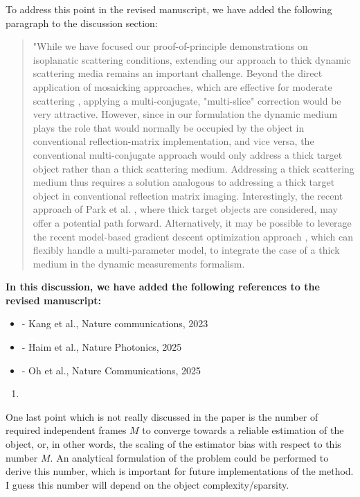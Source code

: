 \documentclass[12pt]{article}
\newenvironment{solved_reviewercomment}
    {\begin{tcolorbox}[width=\linewidth,colback=gray!5,colframe=solved_commentcolor!50,title=Reviewer Comment,left=5pt,right=5pt]}
    {\end{tcolorbox}}
\newenvironment{ourresponse}
    {\begin{tcolorbox}[width=\linewidth,breakable,enhanced,colback=gray!5,colframe=responsecolor!50,title=Response,left=5pt,right=5pt]}
    {\end{tcolorbox}}
\begin{document}
\begin{ourresponse}
    To address this point in the revised manuscript, we have added the following paragraph to the discussion section:
    \begin{quote}
        "While we have focused our proof-of-principle demonstrations on isoplanatic scattering conditions, extending our approach to thick dynamic scattering media remains an important challenge. Beyond the direct application of mosaicking approaches, which are effective for moderate scattering \cite{lee22, najar2024harnessing}, applying a multi-conjugate, "multi-slice" correction \cite{kang2023tracing, haim2025image} would be very attractive. However, since in our formulation the dynamic medium plays the role that would normally be occupied by the object in conventional reflection-matrix implementation, and vice versa, the conventional multi-conjugate approach would only address a thick target object rather than a thick scattering medium. Addressing a thick scattering medium thus requires a solution analogous to addressing a thick target object in conventional reflection matrix imaging. Interestingly, the recent approach of Park et al. \cite{oh2025digital}, where thick target objects are considered, may offer a potential path forward. 
        Alternatively, it may be possible to leverage the recent model-based gradient descent optimization approach  \cite{haim2025image}, which can flexibly handle a multi-parameter model, to integrate the case of a thick medium in the dynamic measurements formalism. 
    \end{quote}

    \textbf{In this discussion, we have added the following references to the revised manuscript:}
    \begin{itemize}[nosep]
    \item \cite{kang2023tracing} - Kang et al., Nature communications, 2023
    \item \cite{haim2025image} - Haim et al., Nature Photonics, 2025
    \item \cite{oh2025digital} - Oh et al., Nature Communications, 2025
    \end{itemize}
    
\end{ourresponse}

\begin{enumerate}[label=\arabic*., resume]
\item \leavevmode
\end{enumerate}
\vspace{-1em}
\begin{solved_reviewercomment}
    One last point which is not really discussed in the paper is the number of required independent frames \(M\) to converge towards a reliable estimation of the object, or, in other words, the scaling of the estimator bias with respect to this number \(M\). An analytical formulation of the problem could be performed to derive this number, which is important for future implementations of the method. I guess this number will depend on the object complexity/sparsity.
\end{solved_reviewercomment}
    
\end{document}
